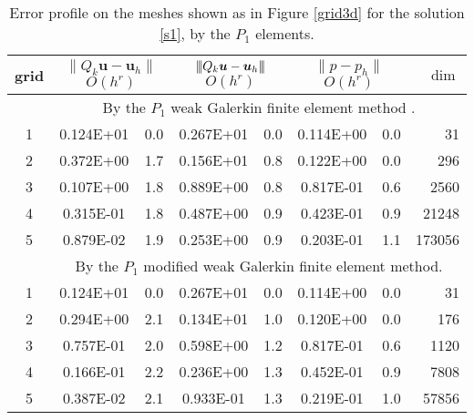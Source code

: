 \documentclass[11pt]{amsart}
\def\3bar{{|\hspace{-.02in}|\hspace{-.02in}|}}
\begin{document}
\begin{table}[ht]
  \centering  \renewcommand{\arraystretch}{1.2}
  \caption{Error profile on the meshes shown as in Figure \ref{grid3d}
    for the solution \eqref{s1}, by the $P_1$ elements. }
  \label{t1}
\begin{tabular}{c|cc|cc|cc|r}
\hline
grid & \multicolumn{2}{c|}{ $\|Q_k \bm{u}-\bm{u}_h\| $    $O(h^r)$}
   & \multicolumn{2}{c|}{  $\3bar{Q_k \bm{u}-\bm{u}_h}\3bar$  $O(h^r)$}
    &  \multicolumn{2}{c|}{ $ \| p-p_h\| $  $O(h^r)$}& $\dim$  
  \\ \hline
    &  \multicolumn{7}{c}{ By the  $P_1$ weak Galerkin finite element method \cite{Mu-W-Y-Z}. }   \\
\hline 
 1&   0.124E+01& 0.0&   0.267E+01& 0.0&   0.114E+00& 0.0&     31 \\
 2&   0.372E+00& 1.7&   0.156E+01& 0.8&   0.122E+00& 0.0&    296 \\
 3&   0.107E+00& 1.8&   0.889E+00& 0.8&   0.817E-01& 0.6&   2560 \\
 4&   0.315E-01& 1.8&   0.487E+00& 0.9&   0.423E-01& 0.9&  21248 \\ 
 5&   0.879E-02& 1.9&   0.253E+00& 0.9&   0.203E-01& 1.1& 173056 \\
\hline
    &  \multicolumn{7}{c}{ By the  $P_1$ modified weak Galerkin finite element method. }   \\
\hline
 1&   0.124E+01& 0.0&   0.267E+01& 0.0&   0.114E+00& 0.0&     31 \\
 2&   0.294E+00& 2.1&   0.134E+01& 1.0&   0.120E+00& 0.0&    176 \\
 3&   0.757E-01& 2.0&   0.598E+00& 1.2&   0.817E-01& 0.6&   1120 \\
 4&   0.166E-01& 2.2&   0.236E+00& 1.3&   0.452E-01& 0.9&   7808 \\ 
 5&   0.387E-02& 2.1&   0.933E-01& 1.3&   0.219E-01& 1.0&  57856 \\
\hline
    \end{tabular}%
\end{table}%
\end{document}
